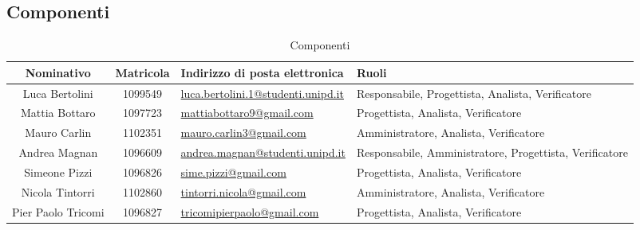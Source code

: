 \documentclass[./PianoDiProgetto.tex]{subfiles}
\begin{document}
\subsection{Componenti}
\begin{table}[H]
	\begin{center}
		\setlength{\extrarowheight}{\jot}
		\begin{tabular}{|c|c|p{5cm}|p{4.3cm}|}
			\hline
			\textbf{Nominativo} & \textbf{Matricola} & \raggedright \textbf{Indirizzo di posta elettronica} & \textbf{Ruoli} \\[1ex]
			\hline
	 		Luca Bertolini & 1099549	& \href{mailto:luca.bertolini.1@studenti.unipd.it}{luca.bertolini.1@studenti.unipd.it} & Responsabile, Progettista, Analista, Verificatore \\[1ex]
			\hline
			Mattia Bottaro & 1097723	& \href{mailto:mattiabottaro9@gmail.com}{mattiabottaro9@gmail.com} &Progettista, Analista, Verificatore  \\[1ex]
			\hline
			Mauro Carlin & 1102351	& \href{mailto:indirizzo@ema.il}{mauro.carlin3@gmail.com} & Amministratore, Analista, Verificatore	\\[1ex]
			\hline
			Andrea Magnan & 1096609 & \href{mailto:andrea.magnan@studenti.unipd.it}{andrea.magnan@studenti.unipd.it} & Responsabile, Amministratore, Progettista, Verificatore \\[1ex]
			\hline
			Simeone Pizzi & 1096826	& \href{mailto:sime.pizzi@gmail.com}{sime.pizzi@gmail.com} 	& Progettista, Analista, Verificatore \\[1ex]
			\hline
			Nicola Tintorri	& 1102860 & \href{mailto:tintorri.nicola@gmail.com}{tintorri.nicola@gmail.com} & Amministratore, Analista, Verificatore 	\\[1ex]
			\hline
			Pier Paolo Tricomi	& 1096827	& \href{mailto:tricomipierpaolo@gmail.com}{tricomipierpaolo@gmail.com} & Progettista, Analista, Verificatore \\[1ex]
			\hline	
		\end{tabular}
	\end{center}
	\caption{Componenti}
\end{table}
\end{document}
